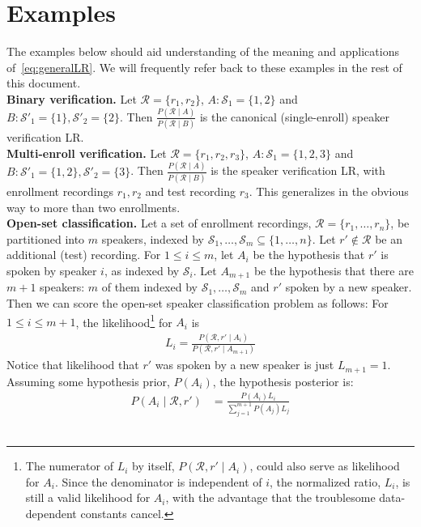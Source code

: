 \documentclass[a4paper,oneside,12pt,english]{report}
\def\Rset{\mathcal{R}}
\def\Sset{\mathcal{S}}
\begin{document}
\section{Examples}
\label{sec:examples}
The examples below should aid understanding of the meaning and applications of~\eqref{eq:generalLR}. We will frequently refer back to these examples in the rest of this document.\\

\noindent\textbf{Binary verification.} Let $\Rset=\{r_1,r_2\}$, $A:\Sset_1=\{1,2\}$ and $B:\Sset'_1=\{1\},\Sset'_2=\{2\}$. Then $\frac{P(\Rset\mid A)}{P(\Rset\mid B)}$ is the canonical (single-enroll) speaker verification LR.\\

\noindent\textbf{Multi-enroll verification.} Let $\Rset=\{r_1,r_2,r_3\}$, $A:\Sset_1=\{1,2,3\}$ and $B:\Sset'_1=\{1,2\},\Sset'_2=\{3\}$. Then $\frac{P(\Rset\mid A)}{P(\Rset\mid B)}$ is the speaker verification LR, with enrollment recordings $r_1,r_2$ and test recording $r_3$. This generalizes in the obvious way to more than two enrollments.\\

\noindent\textbf{Open-set classification.} Let a set of enrollment recordings, $\Rset=\{r_1,\ldots,r_n\}$, be partitioned into $m$ speakers, indexed by $\Sset_1,\ldots,\Sset_m\subseteq\{1,\ldots,n\}$. Let $r'\not\in\Rset$ be an additional (test) recording. For $1\le i\le m$, let $A_i$ be the hypothesis that $r'$ is spoken by speaker $i$, as indexed by $\Sset_i$. Let $A_{m+1}$ be the hypothesis that there are $m+1$ speakers: $m$ of them indexed by $\Sset_1,\ldots,\Sset_m$ and $r'$ spoken by a new speaker.  Then we can score the open-set speaker classification problem as follows: For $1\le i\le m+1$, the likelihood\footnote{The numerator of $L_i$ by itself, $P(\Rset,r'\mid A_i)$, could also serve as likelihood for $A_i$. Since the denominator is independent of $i$, the normalized ratio, $L_i$, is still a valid likelihood for $A_i$, with the advantage that the troublesome data-dependent constants cancel.} for $A_i$ is 
\begin{align}
L_i=\frac{P(\Rset,r'\mid A_i)}{P(\Rset,r'\mid A_{m+1})}
\end{align}
Notice that likelihood that $r'$ was spoken by a new speaker is just $L_{m+1}=1$. Assuming some hypothesis prior, $P(A_i)$, the hypothesis posterior is:
\begin{align}
P(A_i\mid\Rset,r') &= \frac{P(A_i)L_i}{\sum_{j=1}^{m+1} P(A_j)L_j}
\end{align}\\
	
\end{document}
